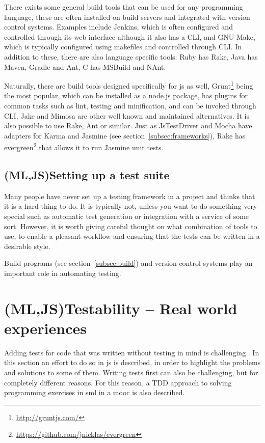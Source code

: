 \documentclass[11pt]{article}
\begin{document}
There exists some general build tools that can be used for any programming language, these are often installed on build servers and integrated with version control systems. Examples include Jenkins, which is often configured and controlled through its web interface although it also has a CLI, and GNU Make, which is typically configured using makefiles and controlled through CLI. In addition to these, there are also language specific tools: Ruby has Rake, Java has Maven, Gradle and Ant, C\nolinebreak\hspace{-.05em}\raisebox{.3ex}{\scriptsize\bf \#} has MSBuild and NAnt.

Naturally, there are build tools designed specifically for \gls{js} as well, Grunt\footnote{\url{http://gruntjs.com/}} being the most popular, which can be installed as a node.js package, has plugins for common tasks such as lint, testing and minification, and can be invoked through CLI. \cite[question~52]{Edelstam} Jake and Mimosa are other well known and maintained alternatives. It is also possible to use Rake, Ant or similar. Just as JsTestDriver and Mocha have adapters for Karma and Jasmine (see section~\ref{subsec:frameworks}), Rake has evergreen\footnote{\url{https://github.com/jnicklas/evergreen}} that allows it to run Jasmine unit tests. \cite{BuildTools}\cite[question~6]{Ahnve}

\subsection{(ML,JS)Setting up a test suite}

Many people have never set up a testing framework in a project and thinks that it is a hard thing to do. It is typically not, unless you want to do something very special such as automatic test generation or integration with a service of some sort. However, it is worth giving careful thought on what combination of tools to use, to enable a pleasant workflow and ensuring that the tests can be written in a desirable style.

Build programs (see section~\ref{subsec:build}) and version control systems play an important role in automating testing.


\section{(ML,JS)Testability -- Real world experiences}
\label{sec:testability}

Adding tests for code that was written without testing in mind is challenging \cite[p.~18]{Tddjs}. In this section an effort to do so in \gls{js} is described, in order to highlight the problems and solutions to some of them. Writing tests first can also be challenging, but for completely different reasons. For this reason, a TDD approach to solving programming exercises in \gls{sml} in a \gls{mooc} is also described.
\end{document}
